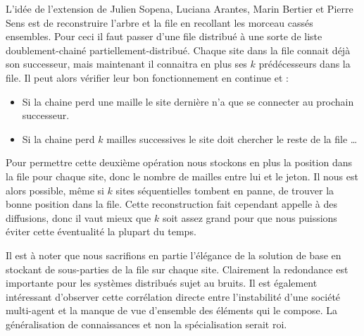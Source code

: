 L'idée de l'extension de \mbox{Julien} \mbox{Sopena}, \mbox{Luciana} \mbox{Arantes}, \mbox{Marin} \mbox{Bertier} et \mbox{Pierre} \mbox{Sens} est de reconstruire l'arbre et la file en recollant les morceau cassés ensembles. Pour ceci il faut passer d'une file distribué à une sorte de liste doublement-chainé partiellement-distribué. Chaque site dans la file connait déjà son successeur, mais maintenant il connaitra en plus ses $k$ prédécesseurs dans la file. Il peut alors vérifier leur bon fonctionnement en continue et :

\begin{itemize}
\item Si la chaine perd une maille le site dernière n'a que se connecter au prochain successeur.
\item Si la chaine perd $k$ mailles successives le site doit chercher le reste de la file \dots
\end{itemize}

Pour permettre cette deuxième opération nous stockons en plus la position dans la file pour chaque site, donc le nombre de mailles entre lui et le jeton. Il nous est alors possible, même si $k$ sites séquentielles tombent en panne, de trouver la bonne position dans la file. Cette reconstruction fait cependant appelle à des diffusions, donc il vaut mieux que $k$ soit assez grand pour que nous puissions éviter cette éventualité la plupart du temps.

Il est à noter que nous sacrifions en partie l'élégance de la solution de base en stockant de sous-parties de la file sur chaque site. Clairement la redondance est importante pour les systèmes distribués sujet au bruits. 
Il est également intéressant d'observer cette corrélation directe entre l'instabilité d'une société multi-agent et la manque de vue d'ensemble des éléments qui le compose. La généralisation de connaissances et non la spécialisation serait roi.